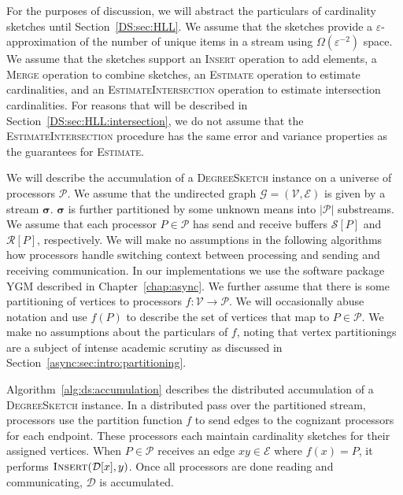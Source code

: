 \documentclass{report}
\newcommand{\algoname}[1]{\textnormal{\textsc{#1}}}
\begin{document}
For the purposes of discussion, we will abstract the particulars of cardinality sketches until Section~\ref{DS:sec:HLL}.
We assume that the sketches provide a $\varepsilon$-approximation of the number of unique items in a stream using $\Omega(\varepsilon^{-2})$ space.
We assume that the sketches support an \algoname{Insert} operation to add elements, a \algoname{Merge} operation to combine sketches, an \algoname{Estimate} operation to estimate cardinalities, and an \algoname{EstimateIntersection} operation to estimate intersection cardinalities.
For reasons that will be described in Section~\ref{DS:sec:HLL:intersection}, we do not assume that the \algoname{EstimateIntersection} procedure has the same error and variance properties as the guarantees for \algoname{Estimate}.

We will describe the accumulation of a \algoname{DegreeSketch} instance on a universe of processors $\mathcal{P}$. 
We assume that the undirected graph $\mathcal{G} = (\mathcal{V}, \mathcal{E})$ is given by a stream $\boldsymbol{\sigma}$.
$\boldsymbol{\sigma}$ is further partitioned by some unknown means into $|\mathcal{P}|$ substreams.
We assume that each processor $P \in \mathcal{P}$ has send and receive buffers $\mathcal{S}[P]$ and $\mathcal{R}[P]$, respectively.
We will make no assumptions in the following algorithms how processors handle switching context between processing and sending and receiving communication. 
In our implementations we use the software package \algoname{YGM} described in Chapter~\ref{chap:async}.
We further assume that there is some partitioning of vertices to processors $f : \mathcal{V} \rightarrow \mathcal{P}$. 
We will occasionally abuse notation and use $f(P)$ to describe the set of vertices that map to $P \in \mathcal{P}$.
We make no assumptions about the particulars of $f$, noting that vertex partitionings are a subject of intense academic scrutiny as discussed in Section~\ref{async:sec:intro:partitioning}.

Algorithm~\ref{alg:ds:accumulation} describes the distributed accumulation of a \algoname{DegreeSketch} instance.
In a distributed pass over the partitioned stream, processors use the partition function $f$ to send edges to the cognizant processors for each endpoint. 
These processors each maintain cardinality sketches for their assigned vertices.
When $P \in \mathcal{P}$ receives an edge $xy \in \mathcal{E}$ where $f(x) = P$, it performs $\algoname{Insert}(\mathcal{D}[x], y)$.
Once all processors are done reading and communicating, $\mathcal{D}$ is accumulated.
\end{document}
